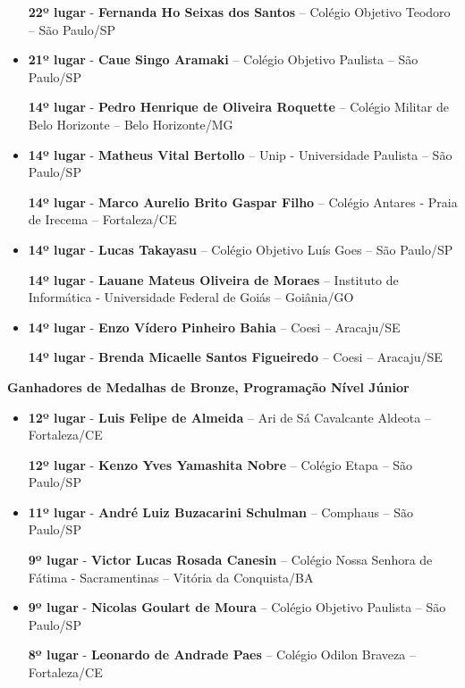 \documentclass{article}
\begin{document}
\begin{itemize}
\textbf{22º lugar} - \textbf{Fernanda Ho Seixas dos Santos} – Colégio Objetivo Teodoro – São Paulo/SP



\item
\textbf{21º lugar} - \textbf{Caue Singo Aramaki} – Colégio Objetivo Paulista – São Paulo/SP


\textbf{14º lugar} - \textbf{Pedro Henrique de Oliveira Roquette} – Colégio Militar de Belo Horizonte – Belo Horizonte/MG



\item
\textbf{14º lugar} - \textbf{Matheus Vital Bertollo} – Unip - Universidade Paulista – São Paulo/SP


\textbf{14º lugar} - \textbf{Marco Aurelio Brito Gaspar Filho} – Colégio Antares - Praia de Irecema – Fortaleza/CE



\item
\textbf{14º lugar} - \textbf{Lucas Takayasu} – Colégio Objetivo Luís Goes – São Paulo/SP


\textbf{14º lugar} - \textbf{Lauane Mateus Oliveira de Moraes} – Instituto de Informática - Universidade Federal de Goiás – Goiânia/GO



\item
\textbf{14º lugar} - \textbf{Enzo Vídero Pinheiro Bahia} – Coesi – Aracaju/SE


\textbf{14º lugar} - \textbf{Brenda Micaelle Santos Figueiredo} – Coesi – Aracaju/SE



\end{itemize}

\textbf{\color{blue}Ganhadores de Medalhas de Bronze, \color{black}Programação Nível Júnior}
\color{black}

\begin{itemize}
\item
\textbf{12º lugar} - \textbf{Luis Felipe de Almeida} – Ari de Sá Cavalcante Aldeota – Fortaleza/CE


\textbf{12º lugar} - \textbf{Kenzo Yves Yamashita Nobre} – Colégio Etapa – São Paulo/SP



\item
\textbf{11º lugar} - \textbf{André Luiz Buzacarini Schulman} – Comphaus – São Paulo/SP


\textbf{9º lugar} - \textbf{Victor Lucas Rosada Canesin} – Colégio Nossa Senhora de Fátima - Sacramentinas – Vitória da Conquista/BA



\item
\textbf{9º lugar} - \textbf{Nicolas Goulart de Moura} – Colégio Objetivo Paulista – São Paulo/SP


\textbf{8º lugar} - \textbf{Leonardo de Andrade Paes} – Colégio Odilon Braveza – Fortaleza/CE



\end{itemize}
\end{document}
